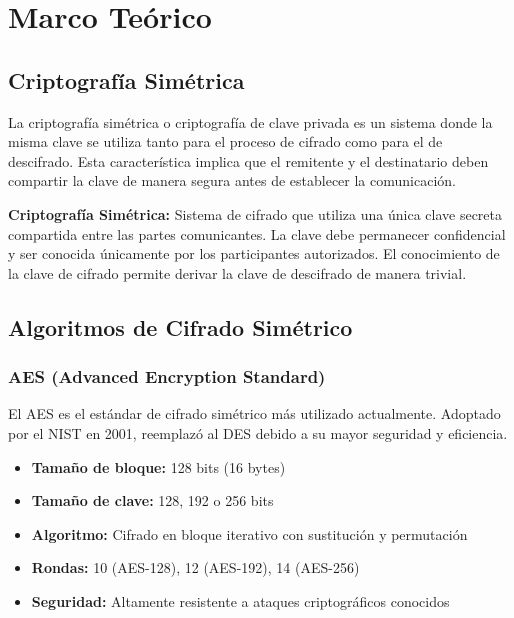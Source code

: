 \documentclass[11pt,a4paper]{article}
\begin{document}
\section{Marco Teórico}

\subsection{Criptografía Simétrica}

La criptografía simétrica o criptografía de clave privada es un sistema donde la misma clave se utiliza tanto para el proceso de cifrado como para el de descifrado. Esta característica implica que el remitente y el destinatario deben compartir la clave de manera segura antes de establecer la comunicación.

\begin{definicion}
\textbf{Criptografía Simétrica:} Sistema de cifrado que utiliza una única clave secreta compartida entre las partes comunicantes. La clave debe permanecer confidencial y ser conocida únicamente por los participantes autorizados. El conocimiento de la clave de cifrado permite derivar la clave de descifrado de manera trivial.
\end{definicion}

\subsection{Algoritmos de Cifrado Simétrico}

\subsubsection{AES (Advanced Encryption Standard)}

El AES es el estándar de cifrado simétrico más utilizado actualmente. Adoptado por el NIST en 2001, reemplazó al DES debido a su mayor seguridad y eficiencia.

\begin{itemize}
    \item \textbf{Tamaño de bloque:} 128 bits (16 bytes)
    \item \textbf{Tamaño de clave:} 128, 192 o 256 bits
    \item \textbf{Algoritmo:} Cifrado en bloque iterativo con sustitución y permutación
    \item \textbf{Rondas:} 10 (AES-128), 12 (AES-192), 14 (AES-256)
    \item \textbf{Seguridad:} Altamente resistente a ataques criptográficos conocidos
\end{itemize}
\end{document}

